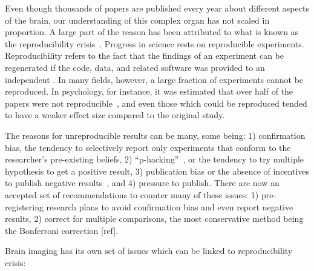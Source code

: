 Even though thousands of papers are published every year about different aspects of the brain, our understanding of this complex organ has not scaled in proportion. A large part of the reason has been attributed to what is known as the reproducibility crisis~\citep{ioannidis2005most, simmons2011false, button2013power}. %
Progress in science rests on reproducible experiments. Reproducibility refers to the fact that the findings of an experiment can be regenerated if the code, data, and related software was provided to an independent . In many fields, however, a large fraction of experiments cannot be reproduced. In psychology, for instance, it was estimated that over half of the papers were not reproducible~\citep{open2015estimating}, and even those which could be reproduced tended to have a weaker effect size compared to the original study. 

The reasons for unreproducible results can be many, some being: 1) confirmation bias, the tendency to selectively report only experiments that conform to the researcher's pre-existing beliefs, 2) ``p-hacking''~\citep{simmons2011false}, or the tendency to try multiple hypothesis to get a positive result, 3) publication bias or the absence of incentives to publish negative results~\citep{rosenthal1979file}, and 4) pressure to publish. There are now an accepted set of recommendations to counter many of these issues: 1) pre-registering research plans to avoid confirmation bias and even report negative results, 2) correct for multiple comparisons, the most conservative method being the Bonferroni correction [ref]. 

Brain imaging has its own set of issues which can be linked to reproducibility crisis: 


